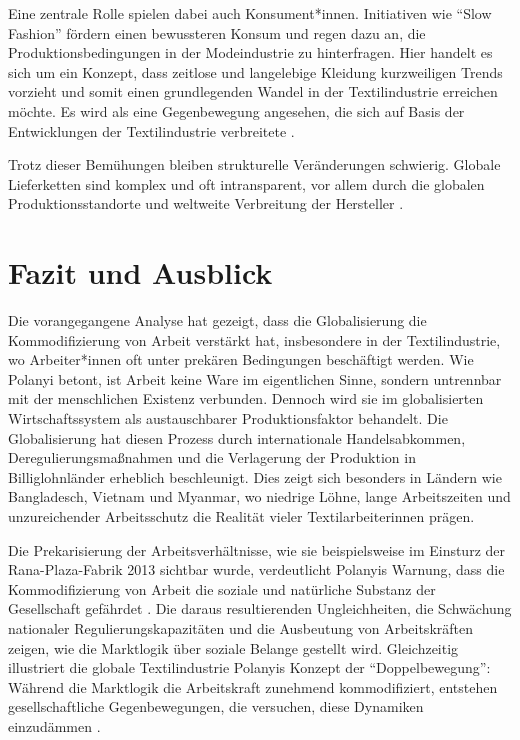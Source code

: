 \documentclass[12pt]{article}
\begin{document}
Eine zentrale Rolle spielen dabei auch Konsument*innen. Initiativen wie \enquote{Slow Fashion} fördern einen bewussteren Konsum und regen dazu an, die Produktionsbedingungen in der Modeindustrie zu hinterfragen. Hier handelt es sich um ein Konzept, dass zeitlose und langelebige Kleidung kurzweiligen Trends vorzieht und somit einen grundlegenden Wandel in der Textilindustrie erreichen möchte. Es wird als eine Gegenbewegung angesehen, die sich auf Basis der Entwicklungen der Textilindustrie verbreitete \autocite[vgl.][]{nina_kegel_slow_nodate}. 

Trotz dieser Bemühungen bleiben strukturelle Veränderungen schwierig. Globale Lieferketten sind komplex und oft intransparent, vor allem durch die globalen Produktionsstandorte und weltweite Verbreitung der Hersteller \autocite[vgl.][]{imsirovic_hinter_2023}.

\section{Fazit und Ausblick}
Die vorangegangene Analyse hat gezeigt, dass die Globalisierung die Kommodifizierung von Arbeit verstärkt hat, insbesondere in der Textilindustrie, wo Arbeiter*innen oft unter prekären Bedingungen beschäftigt werden. Wie Polanyi betont, ist Arbeit keine Ware im eigentlichen Sinne, sondern untrennbar mit der menschlichen Existenz verbunden. Dennoch wird sie im globalisierten Wirtschaftssystem als austauschbarer Produktionsfaktor behandelt. Die Globalisierung hat diesen Prozess durch internationale Handelsabkommen, Deregulierungsmaßnahmen und die Verlagerung der Produktion in Billiglohnländer erheblich beschleunigt. Dies zeigt sich besonders in Ländern wie Bangladesch, Vietnam und Myanmar, wo niedrige Löhne, lange Arbeitszeiten und unzureichender Arbeitsschutz die Realität vieler Textilarbeiterinnen prägen.

Die Prekarisierung der Arbeitsverhältnisse, wie sie beispielsweise im Einsturz der Rana-Plaza-Fabrik 2013 sichtbar wurde, verdeutlicht Polanyis Warnung, dass die Kommodifizierung von Arbeit die soziale und natürliche Substanz der Gesellschaft gefährdet \autocite[181]{ebner_karl_2021}. Die daraus resultierenden Ungleichheiten, die Schwächung nationaler Regulierungskapazitäten und die Ausbeutung von Arbeitskräften zeigen, wie die Marktlogik über soziale Belange gestellt wird. Gleichzeitig illustriert die globale Textilindustrie Polanyis Konzept der \enquote{Doppelbewegung}: Während die Marktlogik die Arbeitskraft zunehmend kommodifiziert, entstehen gesellschaftliche Gegenbewegungen, die versuchen, diese Dynamiken einzudämmen \autocite[127]{polanyi_levitt_transformations_2019}.
\end{document}

